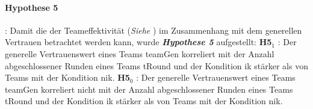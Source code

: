 \documentclass[a4paper,11pt]{article}%
\renewcommand{\\}{\vspace*{0.5\baselineskip} \newline}
\begin{document}
\paragraph{Hypothese 5}:
Damit die der Teameffektivität (\textit{Siehe }) im Zusammenhang mit dem generellen Vertrauen betrachtet werden kann, wurde \textbf{\textit{Hypothese 5}} aufgestellt:\\
\textbf{H5$_{1}$} : Der generelle Vertrauenswert eines Teams \ac{teamGen} korreliert mit der Anzahl abgeschlossener Runden eines Teams \ac{tRound} und der Kondition \ac{ik} stärker als von Teams mit der Kondition \ac{nik}. \newline
\textbf{H5$_{0}$} : Der generelle Vertrauenswert eines Teams \ac{teamGen} korreliert nicht mit der Anzahl abgeschlossener Runden eines Teams \ac{tRound} und der Kondition \ac{ik} stärker als von Teams mit der Kondition \ac{nik}. \\
%
%
%


\end{document}
